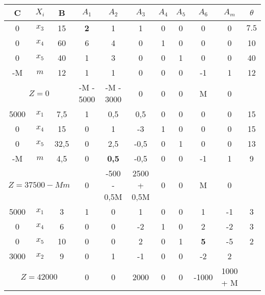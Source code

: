 \documentclass[a4paper,11pt]{article}
\begin{document}
\begin{table}[h!]
\centering
\begin{tabular}{ | c | c | c || c | c | c | c | c | c | c || c | }
  \hline
  C                               & \(X_i\)   & B         & \(A_1\)   & \(A_2\)     & \(A_3\)     & \(A_4\) & \(A_5\) & \(A_6\)          & \(A_m\) & \(\theta\) \\ \hline

  0 & \(x_3\) & 15 & \textbf{2} & 1 & 1 & 0 & 0 & 0  & 0 & \(7.5\) \\ \hline
  0 & \(x_4\) & 60 & 6          & 4 & 0 & 1 & 0 & 0  & 0 & 10 \\ \hline
  0 & \(x_5\) & 40 & 1          & 3 & 0 & 0 & 1 & 0  & 0 & 40 \\ \hline
 -M & \(m\)   & 12 & 1          & 1 & 0 & 0 & 0 & -1 & 1 & 12 \\ \hline \hline
 \multicolumn{3}{|c|}{ \(Z = 0\)}                         & -M - 5000 & -M - 3000 & 0       & 0           & 0           & M       & 0       & \\ \hline \hline

  5000 & \(x_1\) & 7,5  & 1 & 0,5          & 0,5  & 0 & 0 & 0  & 0 & 15 \\ \hline
     0 & \(x_4\) & 15   & 0 & 1            & -3   & 1 & 0 & 0  & 0 & 15 \\ \hline
     0 & \(x_5\) & 32,5 & 0 & 2,5          & -0,5 & 0 & 1 & 0  & 0 & 13 \\ \hline
    -M & \(m\)   & 4,5  & 0 & \textbf{0,5} & -0,5 & 0 & 0 & -1 & 1 & 9 \\ \hline \hline
  \multicolumn{3}{|c|}{ \(Z = 37500 - Mm\)}               & 0       & -500 - 0,5M & 2500 + 0,5M & 0       & 0       & M                & 0       & \\ \hline \hline

    5000   & \(x_1\) & 3  & 1 & 0 & 1  & 0 & 0 & 1          & -1 & 3 \\ \hline
       0   & \(x_4\) & 6  & 0 & 0 & -2 & 1 & 0 & 2          & -2 & 3 \\ \hline
        0  & \(x_5\) & 10 & 0 & 0 & 2  & 0 & 1 & \textbf{5} & -5 & 2 \\ \hline
      3000 & \(x_2\) & 9  & 0 & 1 & -1 & 0 & 0 & -2         & 2  & \\ \hline \hline
   \multicolumn{3}{|c|}{ \(Z = 42000\)}                   & 0       & 0           & 2000        & 0       & 0       & -1000            & 1000 + M & \\ \hline \hline


\end{tabular}
\end{table}
\end{document}
